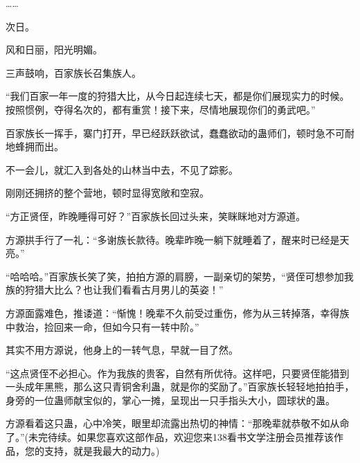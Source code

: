 \begin{this_body}
……

次日。

风和日丽，阳光明媚。

三声鼓响，百家族长召集族人。

“我们百家一年一度的狩猎大比，从今日起连续七天，都是你们展现实力的时候。按照惯例，夺得名次的，都有重赏！接下来，尽情地展现你们的勇武吧。”

百家族长一挥手，寨门打开，早已经跃跃欲试，蠢蠢欲动的蛊师们，顿时急不可耐地蜂拥而出。

不一会儿，就汇入到各处的山林当中去，不见了踪影。

刚刚还拥挤的整个营地，顿时显得宽敞和空寂。

“方正贤侄，昨晚睡得可好？”百家族长回过头来，笑眯眯地对方源道。

方源拱手行了一礼：“多谢族长款待。晚辈昨晚一躺下就睡着了，醒来时已经是天亮。”

“哈哈哈。”百家族长笑了笑，拍拍方源的肩膀，一副亲切的架势，“贤侄可想参加我族的狩猎大比么？也让我们看看古月男儿的英姿！”

方源面露难色，推诿道：“惭愧！晚辈不久前受过重伤，修为从三转掉落，幸得族中救治，捡回来一命，但如今只有一转中阶。”

其实不用方源说，他身上的一转气息，早就一目了然。

“这点贤侄不必担心。作为我族的贵客，自然有所优待。这样吧，只要贤侄能猎到一头成年黑熊，那么这只青铜舍利蛊，就是你的奖励了。”百家族长轻轻地拍拍手，身旁的一位蛊师献宝似的，掌心一摊，呈现出一只手指头大小，圆球状的蛊。

方源看着这只蛊，心中冷笑，眼里却流露出热切的神情：“那晚辈就恭敬不如从命了。”(未完待续。如果您喜欢这部作品，欢迎您来138看书文学注册会员推荐该作品，您的支持，就是我最大的动力。)

\end{this_body}

